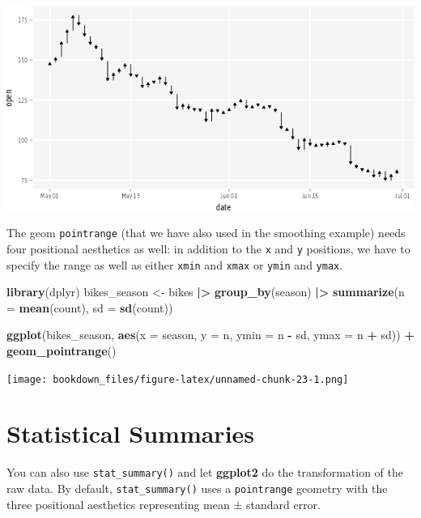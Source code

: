 \documentclass[
]{krantz}
\makeatletter
\newenvironment{Shaded}{\begin{snugshade}}{\end{snugshade}}
\newcommand{\AttributeTok}[1]{\textcolor[rgb]{0.27,0.27,0.27}{#1}}
\newcommand{\FunctionTok}[1]{\textcolor[rgb]{0.27,0.27,0.27}{\textbf{#1}}}
\newcommand{\NormalTok}[1]{#1}
\newcommand{\OtherTok}[1]{\textcolor[rgb]{0.37,0.37,0.37}{#1}}
\newcommand{\SpecialCharTok}[1]{\textcolor[rgb]{0.43,0.43,0.43}{\textbf{#1}}}
\newenvironment{kframe}{%
\medskip{}
\setlength{\fboxsep}{.8em}
 \def\at@end@of@kframe{}%
 \ifinner\ifhmode%
  \def\at@end@of@kframe{\end{minipage}}%
  \begin{minipage}{\columnwidth}%
 \fi\fi%
 \def\FrameCommand##1{\hskip\@totalleftmargin \hskip-\fboxsep
 \colorbox{shadecolor}{##1}\hskip-\fboxsep
     \hskip-\linewidth \hskip-\@totalleftmargin \hskip\columnwidth}%
 \MakeFramed {\advance\hsize-\width
   \@totalleftmargin\z@ \linewidth\hsize
   \@setminipage}}%
 {\par\unskip\endMakeFramed%
 \at@end@of@kframe}
\renewenvironment{Shaded}{\begin{kframe}}{\end{kframe}}
\makeatother
\begin{document}
\includegraphics{bookdown_files/figure-latex/07layerPositionalInputsSegment-1.png}

The geom \texttt{pointrange} (that we have also used in the smoothing example) needs four positional aesthetics as well: in addition to the \texttt{x} and \texttt{y} positions, we have to specify the range as well as either \texttt{xmin} and \texttt{xmax} or \texttt{ymin} and \texttt{ymax}.

\begin{Shaded}
\begin{Highlighting}[]
\FunctionTok{library}\NormalTok{(dplyr)}
\NormalTok{bikes\_season }\OtherTok{\textless{}{-}} 
\NormalTok{  bikes }\SpecialCharTok{|\textgreater{}} 
  \FunctionTok{group\_by}\NormalTok{(season) }\SpecialCharTok{|\textgreater{}} 
  \FunctionTok{summarize}\NormalTok{(}\AttributeTok{n =} \FunctionTok{mean}\NormalTok{(count), }\AttributeTok{sd =} \FunctionTok{sd}\NormalTok{(count))}

\FunctionTok{ggplot}\NormalTok{(bikes\_season, }
       \FunctionTok{aes}\NormalTok{(}\AttributeTok{x =}\NormalTok{ season, }\AttributeTok{y =}\NormalTok{ n, }\AttributeTok{ymin =}\NormalTok{ n }\SpecialCharTok{{-}}\NormalTok{ sd, }\AttributeTok{ymax =}\NormalTok{ n }\SpecialCharTok{+}\NormalTok{ sd)) }\SpecialCharTok{+}
  \FunctionTok{geom\_pointrange}\NormalTok{()}
\end{Highlighting}
\end{Shaded}

\texttt{[image: bookdown\_files/figure-latex/unnamed-chunk-23-1.png]}

\hypertarget{statistical-summaries}{%
\section{Statistical Summaries}\label{statistical-summaries}}

You can also use \texttt{stat\_summary()} and let \textbf{ggplot2} do the transformation of the raw data. By default, \texttt{stat\_summary()} uses a \texttt{pointrange} geometry with the three positional aesthetics representing mean ± standard error.
\end{document}
